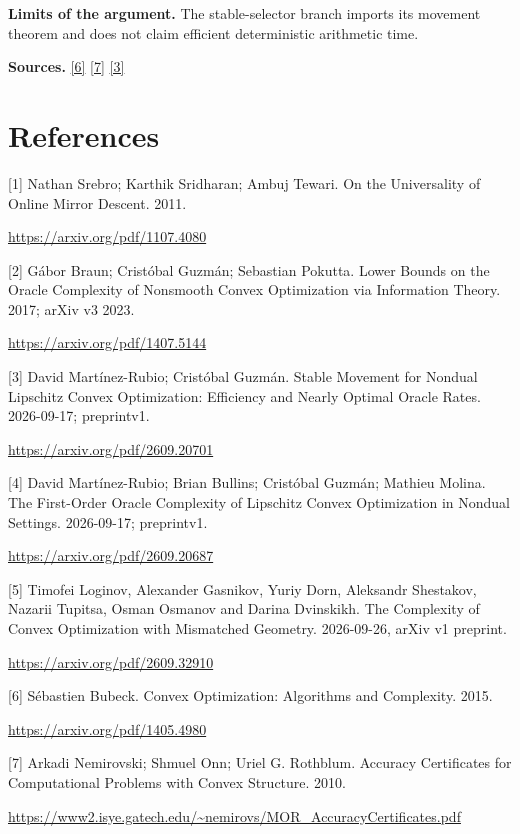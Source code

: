 \documentclass[10pt,a4paper]{article}
\begin{document}
\textbf{Limits of the argument.} The stable-selector branch imports its movement theorem and does not claim efficient deterministic arithmetic time.

\textbf{Sources.} \href{https://arxiv.org/pdf/1405.4980}{[6]} \href{https://www2.isye.gatech.edu/~nemirovs/MOR_AccuracyCertificates.pdf}{[7]} \href{https://arxiv.org/pdf/2609.20701}{[3]}

\section{References}
[1] Nathan Srebro; Karthik Sridharan; Ambuj Tewari. On the Universality of Online Mirror Descent. 2011.

\url{https://arxiv.org/pdf/1107.4080}

[2] Gábor Braun; Cristóbal Guzmán; Sebastian Pokutta. Lower Bounds on the Oracle Complexity of Nonsmooth Convex Optimization via Information Theory. 2017; arXiv v3 2023.

\url{https://arxiv.org/pdf/1407.5144}

[3] David Martínez-Rubio; Cristóbal Guzmán. Stable Movement for Nondual Lipschitz Convex Optimization: Efficiency and Nearly Optimal Oracle Rates. 2026-09-17; preprintv1.

\url{https://arxiv.org/pdf/2609.20701}

[4] David Martínez-Rubio; Brian Bullins; Cristóbal Guzmán; Mathieu Molina. The First-Order Oracle Complexity of Lipschitz Convex Optimization in Nondual Settings. 2026-09-17; preprintv1.

\url{https://arxiv.org/pdf/2609.20687}

[5] Timofei Loginov, Alexander Gasnikov, Yuriy Dorn, Aleksandr Shestakov, Nazarii Tupitsa, Osman Osmanov and Darina Dvinskikh. The Complexity of Convex Optimization with Mismatched Geometry. 2026-09-26, arXiv v1 preprint.

\url{https://arxiv.org/pdf/2609.32910}

[6] Sébastien Bubeck. Convex Optimization: Algorithms and Complexity. 2015.

\url{https://arxiv.org/pdf/1405.4980}

[7] Arkadi Nemirovski; Shmuel Onn; Uriel G. Rothblum. Accuracy Certificates for Computational Problems with Convex Structure. 2010.

\url{https://www2.isye.gatech.edu/~nemirovs/MOR_AccuracyCertificates.pdf}
\end{document}
